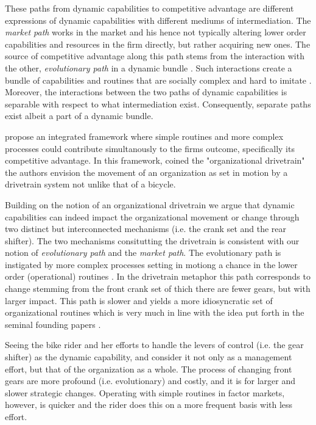 \documentclass[review,fleqn]{elsarticle}\usepackage[]{graphicx}\usepackage[]{color}
\begin{document}
These paths from dynamic capabilities to competitive advantage are different expressions
of dynamic capabilities with different mediums of intermediation. The \emph{market path}
works in the market and his hence not typically altering lower order capabilities and
resources in the firm directly, but rather acquiring new ones. The source of competitive
advantage along this path stems from the interaction with the other, \emph{evolutionary
  path} in a dynamic bundle \citep{Peteraf2013}. Such interactions create a bundle of
capabilities and routines that are socially complex and hard to imitate
\citep[p. 320]{DiStefano2014}. Moreover, the interactions between the two paths of dynamic
capabilities is separable with respect to what intermediation exist. Consequently,
separate paths exist albeit a part of a dynamic bundle.

\cite{DiStefano2014} propose an integrated framework where simple routines and more
complex processes could contribute simultanously to the firms outcome, specifically its
competitive advantage. In this framework, coined the "organizational drivetrain" the
authors envision the movement of an organization as set in motion by a drivetrain system
not unlike that of a bicycle.

Building on the notion of an organizational drivetrain we argue that dynamic capabilities
can indeed impact the organizational movement or change through two distinct but
interconnected mechanisms (i.e. the crank set and the rear shifter). The two mechanisms
consitutting the drivetrain is consistent with our notion of \emph{evolutionary path} and the \emph{market path}. The
evolutionary path is instigated by more complex processes setting in motiong a chance in
the lower order (operational) routines \cite{Collis1994,Winter2003}. In the drivetrain
metaphor this path corresponds to change stemming from the front crank set of thich there
are fewer gears, but with larger impact. This path is slower
and yields a more idiosyncratic set of organizational routines which is very much in line
with the idea put forth in the seminal founding papers \citep{Teece1997,Winter2003}.

Seeing the bike rider and her efforts to handle the levers of control (i.e. the gear
shifter) as the dynamic capability, and consider it not only as a management effort, but
that of the organization as a whole. The process of changing front gears are more profound
(i.e. evolutionary) and costly, and it is for larger and slower strategic
changes. Operating with simple routines in factor markets, however, is quicker and the
rider does this on a more frequent basis with less effort.
\end{document}
